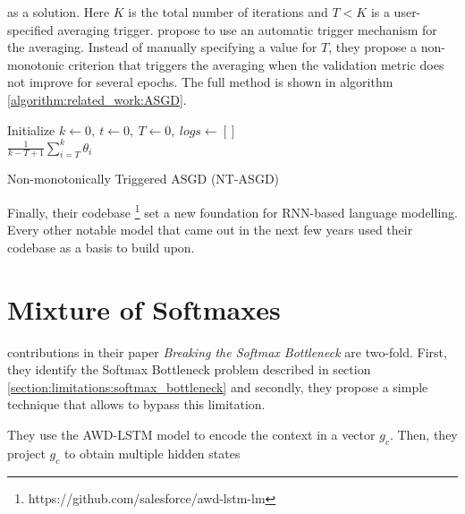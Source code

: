 as a solution. Here $ K $ is the total number of iterations and $ T < K $ is a user-specified averaging trigger. \citet{merity2017regularizing} propose to use an automatic trigger mechanism for the averaging. Instead of manually specifying a value for $ T $, they propose a non-monotonic criterion that triggers the averaging when the validation metric does not improve for several epochs. The full method is shown in algorithm \ref{algorithm:related_work:ASGD}.

\begin{algorithm}[H]
\SetAlgoLined
{}
 Initialize $k \leftarrow 0, \ t \leftarrow 0, \ T \leftarrow 0, \ logs \leftarrow [] $ \\
 \Return $ \frac{1}{k - T + 1} \sum_{i=T}^k \theta_i $
 \caption{Non-monotonically Triggered ASGD (NT-ASGD) \citep{merity2017regularizing}\label{algorithm:related_work:ASGD}}
\end{algorithm}

Finally, their codebase \footnote{https://github.com/salesforce/awd-lstm-lm} set a new foundation for RNN-based language modelling. Every other notable model that came out in the next few years used their codebase as a basis to build upon.

\section{Mixture of Softmaxes}
\label{section:related_work:mos}

\citet{yang2017breaking} contributions in their paper \emph{Breaking the Softmax Bottleneck} are two-fold. First, they identify the Softmax Bottleneck problem described in section \ref{section:limitations:softmax_bottleneck} and secondly, they propose a simple technique that allows to bypass this limitation.

They use the AWD-LSTM model to encode the context in a vector $ g_c $. Then, they project $ g_c $ to obtain multiple hidden states

